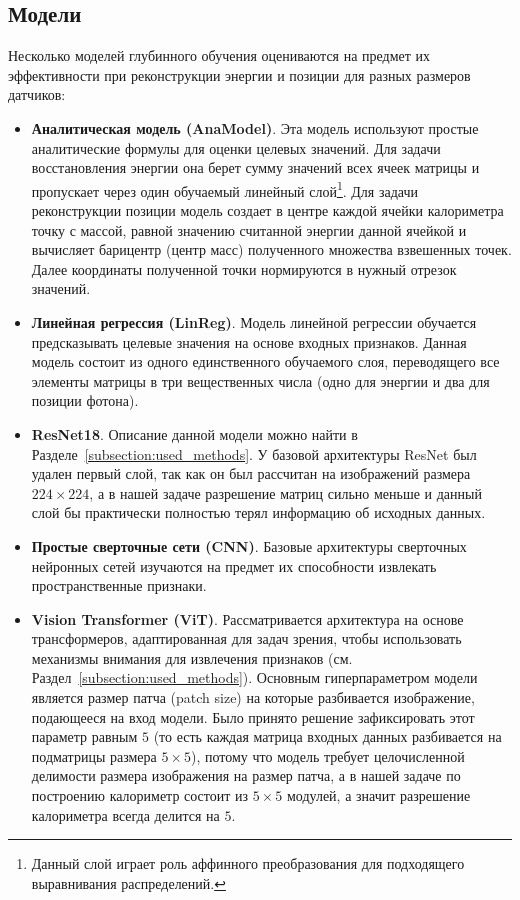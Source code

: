 \documentclass[a4paper,12pt]{extarticle}
\begin{document}
\subsection{Модели}

Несколько моделей глубинного обучения оцениваются на предмет их эффективности при реконструкции энергии и позиции для разных размеров датчиков:

\begin{itemize}
    \item \textbf{Аналитическая модель (AnaModel)}. Эта модель используют простые аналитические формулы для оценки целевых значений. Для задачи восстановления энергии она берет сумму значений всех ячеек матрицы и пропускает через один обучаемый линейный слой\footnote{Данный слой играет роль аффинного преобразования для подходящего выравнивания распределений.}. Для задачи реконструкции позиции модель создает в центре каждой ячейки калориметра точку с массой, равной значению считанной энергии данной ячейкой и вычисляет барицентр (центр масс) полученного множества взвешенных точек. Далее координаты полученной точки нормируются в нужный отрезок значений.
    \item \textbf{Линейная регрессия (LinReg)}. Модель линейной регрессии обучается предсказывать целевые значения на основе входных признаков. Данная модель состоит из одного единственного обучаемого слоя, переводящего все элементы матрицы в три вещественных числа (одно для энергии и два для позиции фотона).
    \item \textbf{ResNet18}. Описание данной модели можно найти в Разделе~\ref{subsection:used_methods}. У базовой архитектуры ResNet был удален первый слой, так как он был рассчитан на изображений размера $224 \times 224$, а в нашей задаче разрешение матриц сильно меньше и данный слой бы практически полностью терял информацию об исходных данных.
    \item \textbf{Простые сверточные сети (CNN)}. Базовые архитектуры сверточных нейронных сетей изучаются на предмет их способности извлекать пространственные признаки.
    \item \textbf{Vision Transformer (ViT)}. Рассматривается архитектура на основе трансформеров, адаптированная для задач зрения, чтобы использовать механизмы внимания для извлечения признаков (см. Раздел~\ref{subsection:used_methods}). Основным гиперпараметром модели является размер патча (patch size) на которые разбивается изображение, подающееся на вход модели. Было принято решение зафиксировать этот параметр равным $5$ (то есть каждая матрица входных данных разбивается на подматрицы размера $5 \times 5$), потому что модель требует целочисленной делимости размера изображения на размер патча, а в нашей задаче по построению калориметр состоит из $5 \times 5$ модулей, а значит разрешение калориметра всегда делится на $5$.
\end{itemize}
\end{document}
